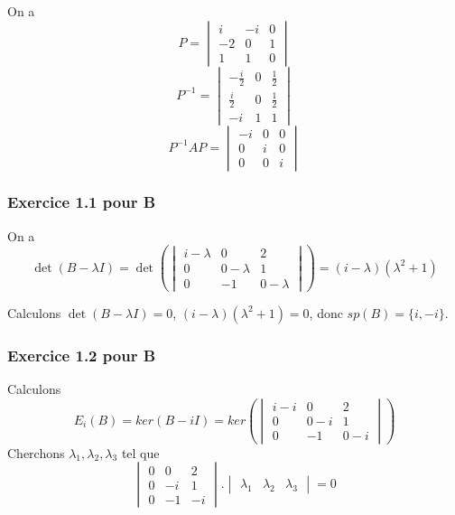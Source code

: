 \documentclass[]{book}
\theoremstyle{definition}
\begin{document}
On a 
$$P = \begin{vmatrix} i & -i & 0 \\ -2 & 0 & 1 \\ 1 & 1 & 0 \end{vmatrix}$$
$$P^{-1} = \begin{vmatrix} -\frac{i}{2} & 0 & \frac{1}{2} \\ \frac{i}{2} & 0 & \frac{1}{2} \\ -i & 1 & 1 \end{vmatrix}$$
$$P^{-1}AP = \begin{vmatrix} -i & 0 & 0 \\ 0 & i & 0 \\ 0 & 0 & i \end{vmatrix}$$



\subsubsection*{Exercice 1.1 pour B}
On a 
$$\det(B -\lambda I) = \det\left(\begin{vmatrix} i-\lambda & 0 & 2 \\ 0 & 0-\lambda & 1 \\ 0 & -1 & 0-\lambda \end{vmatrix}\right) = (i-\lambda)(\lambda^2+1)$$

Calculons $\det(B -\lambda I) = 0$, $(i-\lambda)(\lambda^2+1)=0$, donc $sp(B)=\{i, -i\}$. 

\subsubsection*{Exercice 1.2 pour B}
Calculons
$$E_{i}(B) = ker(B -iI) = ker\left(\begin{vmatrix} i-i & 0 & 2 \\ 0 & 0-i & 1 \\ 0 & -1 & 0-i \end{vmatrix}\right)$$
Cherchons $\lambda_1,\lambda_2,\lambda_3$  tel que
$$\begin{vmatrix} 0 & 0 & 2 \\ 0 & -i & 1 \\ 0 & -1 & -i \end{vmatrix}.\begin{vmatrix} \lambda_1 & \lambda_2 & \lambda_3 \end{vmatrix} = 0$$
\end{document}
